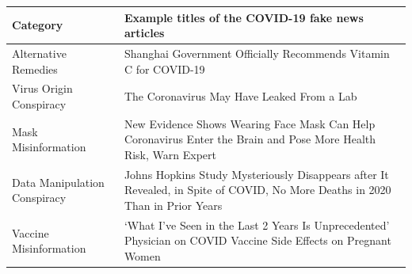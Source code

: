 \begin{table}
\centering %

\begin{tabular}{l p{}}
\toprule
\textbf{Category} & \textbf{Example titles of the COVID-19 fake news articles} \\
\midrule
Alternative Remedies & Shanghai Government Officially Recommends Vitamin C for COVID-19 \\
\addlinespace %
Virus Origin Conspiracy & The Coronavirus May Have Leaked From a Lab \\
\addlinespace
Mask Misinformation & New Evidence Shows Wearing Face Mask Can Help Coronavirus Enter the Brain and Pose More Health Risk, Warn Expert \\
\addlinespace
Data Manipulation Conspiracy & Johns Hopkins Study Mysteriously Disappears after It Revealed, in Spite of COVID, No More Deaths in 2020 Than in Prior Years \\
\addlinespace
Vaccine Misinformation & ‘What I’ve Seen in the Last 2 Years Is Unprecedented’ Physician on COVID Vaccine Side Effects on Pregnant Women \\
\bottomrule
\end{tabular}
\end{table}